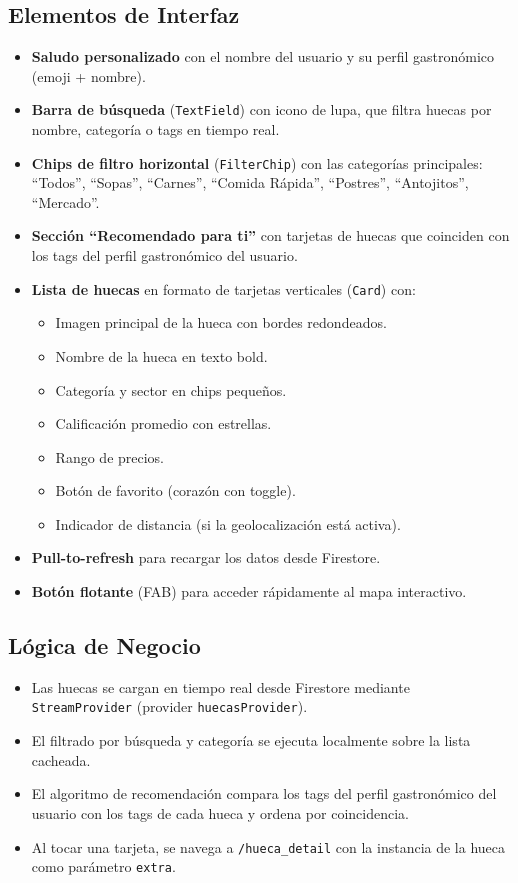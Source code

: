 \documentclass[11pt, a4paper, oneside]{report}
\begin{document}
\subsection{Elementos de Interfaz}
\begin{itemize}
  \item \textbf{Saludo personalizado} con el nombre del usuario y su perfil gastronómico (emoji + nombre).
  \item \textbf{Barra de búsqueda} (\texttt{TextField}) con icono de lupa, que filtra huecas por nombre, categoría o tags en tiempo real.
  \item \textbf{Chips de filtro horizontal} (\texttt{FilterChip}) con las categorías principales: ``Todos'', ``Sopas'', ``Carnes'', ``Comida Rápida'', ``Postres'', ``Antojitos'', ``Mercado''.
  \item \textbf{Sección ``Recomendado para ti''} con tarjetas de huecas que coinciden con los tags del perfil gastronómico del usuario.
  \item \textbf{Lista de huecas} en formato de tarjetas verticales (\texttt{Card}) con:
  \begin{itemize}
    \item Imagen principal de la hueca con bordes redondeados.
    \item Nombre de la hueca en texto bold.
    \item Categoría y sector en chips pequeños.
    \item Calificación promedio con estrellas.
    \item Rango de precios.
    \item Botón de favorito (corazón con toggle).
    \item Indicador de distancia (si la geolocalización está activa).
  \end{itemize}
  \item \textbf{Pull-to-refresh} para recargar los datos desde Firestore.
  \item \textbf{Botón flotante} (FAB) para acceder rápidamente al mapa interactivo.
\end{itemize}

\subsection{Lógica de Negocio}
\begin{itemize}
  \item Las huecas se cargan en tiempo real desde Firestore mediante \texttt{StreamProvider} (provider \texttt{huecasProvider}).
  \item El filtrado por búsqueda y categoría se ejecuta localmente sobre la lista cacheada.
  \item El algoritmo de recomendación compara los tags del perfil gastronómico del usuario con los tags de cada hueca y ordena por coincidencia.
  \item Al tocar una tarjeta, se navega a \texttt{/hueca\_detail} con la instancia de la hueca como parámetro \texttt{extra}.
\end{itemize}
\end{document}
